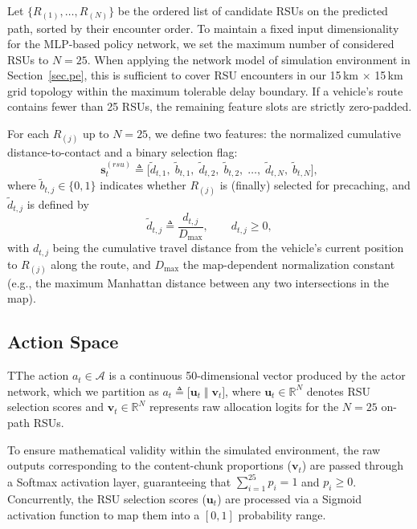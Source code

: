 Let $\{R_{(1)},\ldots,R_{(N)}\}$ be the ordered list of candidate RSUs on the predicted path, sorted by their encounter order. 
To maintain a fixed input dimensionality for the MLP-based policy network, we set the maximum number of considered RSUs to $N=25$. 
When applying the network model of simulation environment in Section~\ref{sec.pe}, this is sufficient to cover RSU encounters in our 15\,km $\times$ 15\,km grid topology within the maximum tolerable delay boundary. 
If a vehicle’s route contains fewer than 25 RSUs, the remaining feature slots are strictly zero-padded.

For each $R_{(j)}$ up to $N=25$, we define two features: the normalized cumulative distance-to-contact and a binary selection flag:
\begin{equation}
\mathbf{s}^{(rsu)}_t \triangleq 
\Big[
\tilde{d}_{t,1},\;\tilde{b}_{t,1},\;\tilde{d}_{t,2},\;\tilde{b}_{t,2},\;\ldots,\;\tilde{d}_{t,N},\;\tilde{b}_{t,N}
\Big],
\end{equation}
where $\tilde{b}_{t,j}\in\{0,1\}$ indicates whether $R_{(j)}$ is (finally) selected for precaching, and $\tilde{d}_{t,j}$ is defined by
\begin{equation}
\tilde{d}_{t,j} \triangleq \frac{d_{t,j}}{D_{\max}},\qquad d_{t,j}\ge 0,
\end{equation}
with $d_{t,j}$ being the cumulative travel distance from the vehicle’s current position to $R_{(j)}$ along the route, and $D_{\max}$
the map-dependent normalization constant (e.g., the maximum Manhattan distance between any two intersections in the map).

\subsection{Action Space} \label{subsec:action_space}
TThe action $a_t \in \mathcal{A}$ is a continuous 50-dimensional vector produced by the actor network, which we partition as $a_t \triangleq \big[\mathbf{u}_t \;\Vert\; \mathbf{v}_t\big]$, where $\mathbf{u}_t \in \mathbb{R}^{N}$ denotes RSU selection scores and $\mathbf{v}_t \in \mathbb{R}^{N}$ represents raw allocation logits for the $N=25$ on-path RSUs.


To ensure mathematical validity within the simulated environment, the raw outputs corresponding to the content-chunk proportions ($\mathbf{v}_t$) are passed through a Softmax activation layer, guaranteeing that $\sum_{i=1}^{25} p_i = 1$ and $p_i \ge 0$. Concurrently, the RSU selection scores ($\mathbf{u}_t$) are processed via a Sigmoid activation function to map them into a $[0, 1]$ probability range. 

